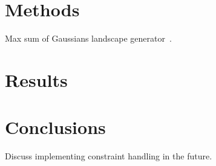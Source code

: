\documentclass{sig-alternate}
\begin{document}
\section{Methods}
Max sum of Gaussians landscape generator~\cite{Gallagher:2006:a}.

\section{Results}

\section{Conclusions}
Discuss implementing constraint handling in the future.



\end{document}
